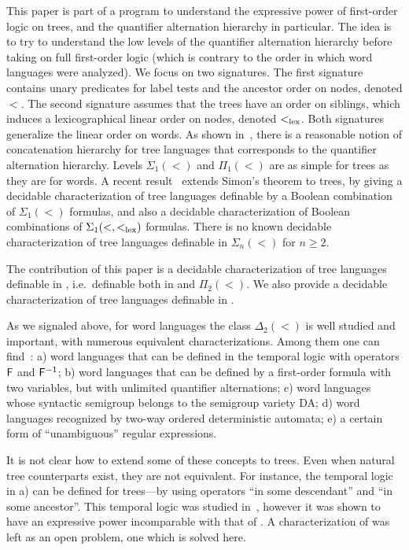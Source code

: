 \documentclass{LMCS}
\begin{document}
This paper is part of a program to understand the expressive power of
first-order logic on trees, and the quantifier alternation hierarchy
in particular. The idea is to try to understand the low levels of the
quantifier alternation hierarchy before taking on full first-order
logic (which is contrary to the order in which word languages were
analyzed). We focus on two signatures. The first signature contains
unary predicates for label tests and the ancestor order on nodes,
denoted $<$. The second signature assumes that the trees have an order
on siblings, which induces a lexicographical linear order on nodes,
denoted $<_\mathrm{lex}$.  Both signatures generalize the linear order on words.
As shown in~\cite{forestexp}, there is a reasonable notion of
concatenation hierarchy for tree languages that corresponds to the
quantifier alternation hierarchy. Levels $\Sigma_1(<)$ and $\Pi_1(<)$
are as simple for trees as they are for words. A recent
result~\cite{simontrees} extends Simon's theorem to trees, by giving a
decidable characterization of tree languages definable by a Boolean
combination of $\Sigma_1(<)$ formulas, and also a decidable
characterization of Boolean combinations of $\Sigma_1(<,<_\mathrm{lex})$
formulas.  There is no known decidable characterization of tree
languages definable in $\Sigma_n(<)$ for $n \ge 2$.

The contribution of this paper is a decidable characterization of tree
languages definable in \Dtwo, i.e.~definable both in \Stwo
and $\Pi_2(<)$.  We also provide a decidable characterization of tree
languages definable in \Dtwol.


As we signaled above, for word languages the class
$\Delta_2(<)$ is well studied and important, with numerous equivalent
characterizations.  Among them one can
find~\cite{weilpinpoly,therienwilkefo2,turtle,EVW02}: a) word
languages that can be defined in the temporal logic with operators
$\mathsf{F}$ and $\mathsf{F}^{-1}$; b) word languages that can be defined by a
first-order formula with two variables, but with unlimited quantifier
alternations; c) word languages whose syntactic semigroup belongs to
the semigroup variety DA; d) word languages recognized by two-way
ordered deterministic automata; e) a certain form of ``unambiguous''
regular expressions.

It is not clear how to extend some of these concepts to trees. Even when
natural tree counterparts exist, they are not equivalent. For instance, the
temporal logic in a) can be defined for trees---by using operators ``in some
descendant'' and ``in some ancestor''.  This temporal logic was studied
in~\cite{fo2tree}, however it was shown to have an expressive power
incomparable with that of \Dtwo. A characterization of \Dtwo was left
as an open problem, one which is solved here.
\end{document}
